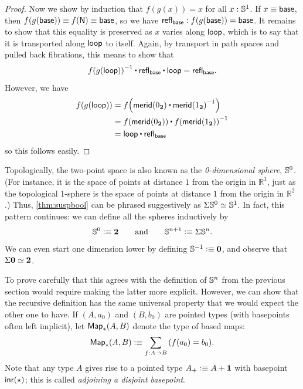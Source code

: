 \begin{proof}
  Now we show by induction that $f(g(x))=x$ for all $x:\mathbb{S}^1$.
  If $x\equiv \mathsf{base}$, then $f(g(\mathsf{base}))\equiv f(\mathsf{N})\equiv\mathsf{base}$, so we have $\mathsf{refl}_{\mathsf{base}} : f(g(\mathsf{base}))=\mathsf{base}$.
  It remains to show that this equality is preserved as $x$ varies along $\mathsf{loop}$, which is to say that it is transported along $\mathsf{loop}$ to itself.
  Again, by transport in path spaces and pulled back fibrations, this means to show that
  \[ \opp{\ap f {\ap g {\lloop}}} \ct \refl{\base} \ct \lloop = \refl{\base}.\]
  However, we have
  \begin{align*}
    \ap f {\ap g {\lloop}} &= \ap f {\merid(\bfalse) \ct \opp{\merid(\btrue)}}\\
    &= \ap f {\merid(\bfalse)} \ct \opp{\ap f {\merid(\btrue)}}\\
    &= \lloop \ct \refl{\base}
  \end{align*}
  so this follows easily.
\end{proof}

Topologically, the two-point space \bool is also known as the \emph{0-dimensional sphere}, $\mathbb{S}^0$.
(For instance, it is the space of points at distance $1$ from the origin in $\mathbb{R}^1$, just as the topological 1-sphere is the space of points at distance $1$ from the origin in $\mathbb{R}^2$.)
Thus, \cref{thm:suspbool} can be phrased suggestively as $\Sigma\mathbb{S}^0 \simeq \mathbb{S}^1$.
%
%
In fact, this pattern continues: we can define all the spheres inductively by
\begin{equation}\label{eq:Snsusp}
  \mathbb{S}^0 \vcentcolon\equiv \mathbf{2}
  \qquad\text{and}\qquad
  \mathbb{S}^{n+1} \vcentcolon\equiv \Sigma \mathbb{S}^n.
\end{equation}
We can even start one dimension lower by defining $\mathbb{S}^{-1}\vcentcolon\equiv \mathbf{0}$, and observe that $\Sigma\mathbf{0} \simeq \mathbf{2}$.

To prove carefully that this agrees with the definition of $\mathbb{S}^n$ from the previous section would require making the latter more explicit.
However, we can show that the recursive definition has the same universal property that we would expect the other one to have.
If $(A,a_0)$ and $(B,b_0)$ are pointed types (with basepoints often left implicit), let $\mathsf{Map}_*(A,B)$ denote the type of based maps:
\[ \Map_*(A,B) \defeq \sm{f:A\to B} (f(a_0)=b_0). \]
Note that any type $A$ gives rise to a pointed type $A_+ \vcentcolon\equiv A+\mathbf{1}$ with basepoint ${\mathsf{inr}}(\star)$; this is called \emph{adjoining a disjoint basepoint}.
%
%
%

